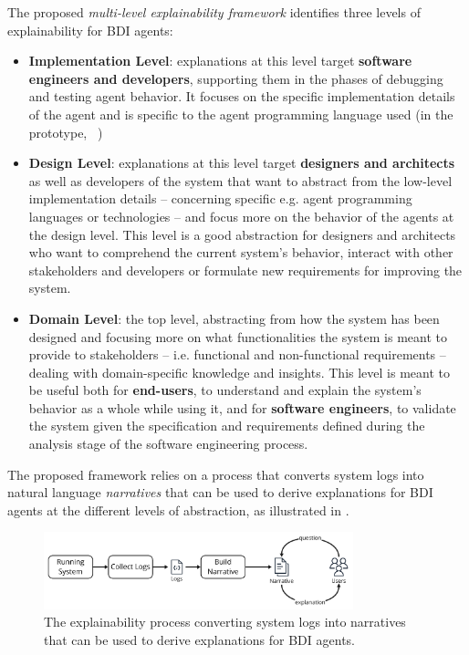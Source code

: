 The proposed \emph{multi-level explainability framework} identifies three levels of explainability for \ac{BDI} agents:
\begin{itemize}
    \item \textbf{Implementation Level}: explanations at this level target \textbf{software engineers and developers}, supporting them in the phases of debugging and testing agent behavior. It focuses on the specific implementation details of the agent and is specific to the agent programming language used (in the prototype, \jason{}~\cite{Bordini_Hübner_Wooldridge_2007})
    \item \textbf{Design Level}: explanations at this level target \textbf{designers and architects} as well as developers of the system that want to abstract from the low-level implementation details -- concerning specific e.g. agent programming languages or technologies -- and focus more on the behavior of the agents at the design level.
    This level is a good abstraction for designers and architects who want to comprehend the current system's behavior, interact with other stakeholders and developers or formulate new requirements for improving the system.
    \item \textbf{Domain Level}: the top level, abstracting from how the system has been designed and focusing more on what functionalities the system is meant to provide to stakeholders -- i.e. functional and non-functional requirements -- dealing with domain-specific knowledge and insights.
    This level is meant to be useful both for \textbf{end-users}, to understand and explain the system's behavior as a whole while using it, and for \textbf{software engineers}, to validate the system given the specification and requirements defined during the analysis stage of the software engineering process.
\end{itemize}

The proposed framework relies on a process that converts system logs into natural language \emph{narratives} that can be used to derive explanations for \ac{BDI} agents at the different levels of abstraction, as illustrated in .

\begin{figure}
        \centering
        \includegraphics[width=0.8\textwidth]{figures/multi-explain/process-new.pdf}
        \caption{The explainability process converting system logs into narratives that can be used to derive explanations for \ac{BDI} agents.}
        \label{fig:explainability-process}
\end{figure}

